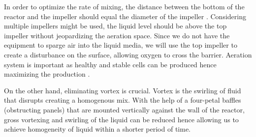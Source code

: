 In order to optimize the rate of mixing, the distance between the bottom of the reactor and the impeller should equal the diameter of the impeller \cite{Doran2012}. Considering multiple impellers might be used, the liquid level should be above the top impeller without jeopardizing the aeration space. Since we do not have the equipment to sparge air into the liquid media, we will use the top impeller to create a disturbance on the surface, allowing oxygen to cross the barrier. Aeration system is important as healthy and stable cells can be produced hence maximizing the production \cite[p.245]{Henze2019}.

On the other hand, eliminating vortex is crucial. Vortex is the swirling of fluid that disrupts creating a homogenous mix. With the help of a four-petal baffles (obstructing panels) that are mounted vertically against the wall of the reactor, gross vortexing and swirling of the liquid can be reduced hence allowing us to achieve homogeneity of liquid within a shorter period of time.